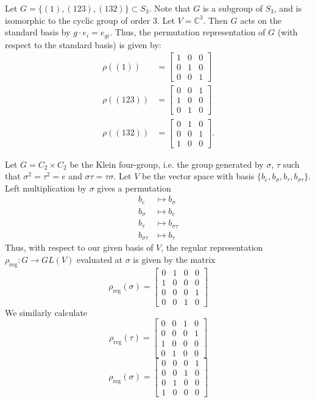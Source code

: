 \begin{example}
Let $G = \{ (1), (123), (132) \} \subset S_3$.  Note that $G$ is a subgroup of $S_3$, and is isomorphic to the cyclic group of order $3$. Let $V= \mathbb{C}^3$.  Then $G$ acts on the standard basis by $g \cdot e_i = e_ {gi}$.  Thus, the permutation representation of $G$ (with respect to the standard basis) is given by:
\begin{align*}
\rho((1)) &= \begin{bmatrix} 1 & 0 & 0 \\ 0 & 1 & 0 \\ 0 & 0 & 1 \end{bmatrix} \\
\rho((123)) &= \begin{bmatrix} 0 & 0 & 1 \\ 1 & 0 & 0 \\ 0 & 1 & 0 \end{bmatrix} \\
\rho((132)) &= \begin{bmatrix} 0 & 1  & 0 \\ 0 & 0 & 1 \\ 1 & 0 & 0 \end{bmatrix}.
\end{align*}
\end{example}

\begin{example}
Let $G= C_2 \times C_2$ be the Klein four-group, i.e. the group generated by $\sigma$, $\tau$ such that $\sigma^2 = \tau^2 = e$ and $\sigma \tau = \tau \sigma$.  Let $V$ be the vector space with basis $\{ b_e, b_\sigma, b_\tau, b_{\sigma \tau} \}$.  Left multiplication by $\sigma$ gives a permutation 
\begin{align*}
b_e &\mapsto b_\sigma\\
b_\sigma &\mapsto b_e \\
b_ \tau &\mapsto b_{\sigma \tau}\\
b_{\sigma \tau} &\mapsto b_\tau
\end{align*}
Thus, with respect to our given basis of $V$, the regular representation $\rho_{\text{reg}} \colon G \to GL(V)$ evaluated at $\sigma$ is given by the matrix
\[  \rho_{\text{reg}}(\sigma) = \begin{bmatrix}0 & 1 & 0 & 0 \\  1 & 0 & 0 & 0 \\ 0 & 0 & 0 & 1 \\ 0 & 0 & 1 & 0 \end{bmatrix} \]
We similarly calculate
\[  \rho_{\text{reg}}(\tau) = \begin{bmatrix}0&0&1&0 \\ 0&0&0&1 \\ 1&0&0&0 \\ 0&1&0&0 \end{bmatrix} \]
\[  \rho_{\text{reg}}(\sigma) = \begin{bmatrix}0&0&0&1 \\ 0&0&1&0 \\ 0&1&0&0 \\ 1&0&0&0 \end{bmatrix} \]
\end{example}

